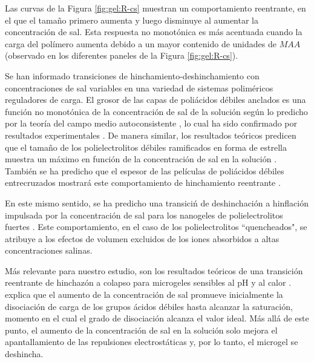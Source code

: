 Las curvas de la Figura \ref{fig:gel:R-cs} muestran un comportamiento reentrante, en el que el tama\~no primero aumenta y luego disminuye al aumentar la concentraci\'on de sal.
Esta respuesta no monot\'onica es m\'as acentuada cuando la carga del pol\'imero aumenta debido a un mayor contenido de unidades de $MAA$ (observado en los diferentes paneles de la Figura \ref{fig:gel:R-cs}).

Se han informado transiciones de hinchamiento-deshinchamiento con concentraciones de sal variables en una variedad de sistemas polim\'ericos reguladores de carga.
El grosor de las capas de poli\'acidos d\'ebiles anclados es una funci\'on no monot\'onica de la concentraci\'on de sal de la soluci\'on seg\'un lo predicho por la teor\'ia del campo medio autoconsistente \cite{Israels1994, Lyatskaya1995, Zhulina1995, Gong2007}, lo cual ha sido confirmado por resultados experimentales \cite{Wu2007}.
De manera similar, los resultados te\'oricos predicen que el tama\~no de los polielectrolitos d\'ebiles ramificados en forma de estrella muestra un m\'aximo en funci\'on de la concentraci\'on de sal en la soluci\'on \cite{Borisov1998, KleinWolterink2002}.
Tambi\'en se ha predicho que el espesor de las pel\'iculas de poli\'acidos d\'ebiles entrecruzados mostrar\'a este comportamiento de hinchamiento reentrante \cite{Longo2014JCP}.






En este mismo sentido, se ha predicho una transici\'n de deshinchaci\'on a hinflaci\'on impulsada por la concentraci\'on de sal para los nanogeles de polielectrolitos fuertes \cite{jha2012understanding}. Este comportamiento, en el caso de los polielectrolitos ``quencheados", se atribuye a los efectos de volumen excluidos de los iones absorbidos a altas concentraciones salinas.

M\'as relevante para nuestro estudio, son los resultados te\'oricos de una transici\'on reentrante de hinchaz\'on a colapso para microgeles sensibles al pH y al calor \cite{polotsky2013collapse}. \citet{polotsky2013collapse} explica que el aumento de la concentraci\'on de sal promueve inicialmente la disociaci\'on de carga de los grupos \'acidos d\'ebiles hasta alcanzar la saturaci\'on, momento en el cual el grado de disociaci\'on alcanza el valor ideal. M\'as all\'a de este punto, el aumento de la concentraci\'on de sal en la soluci\'on solo mejora el apantallamiento de las repulsiones electrost\'aticas y, por lo tanto, el microgel se deshincha.

